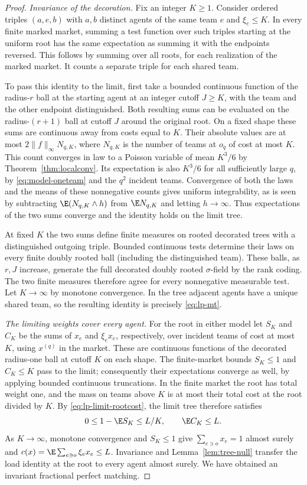 \begin{proof}
\emph{Invariance of the decoration.}
Fix an integer $K\ge1$. Consider ordered triples $(a,e,b)$ with $a,b$ distinct agents of
the same team $e$ and $\xi_e\le K$. In every finite marked market, summing a test function
over such triples starting at the uniform root has the same expectation as summing it
with the endpoints reversed. This follows by summing over all roots, for each realization
of the marked market. It counts a separate triple for each shared team.

To pass this identity to the limit, first take a bounded continuous function of the
radius-$r$ ball at the starting agent at an integer cutoff $J\ge K$, with the team and
the other endpoint distinguished. Both resulting sums can be evaluated on the
radius-$(r+1)$ ball at cutoff $J$ around the original root. On a fixed shape these sums
are continuous away from costs equal to $K$. Their absolute values are at most
$2\|f\|_\infty N_{q,K}$, where $N_{q,K}$ is the number of teams at $o_q$ of cost at most $K$.
This count converges in law to a Poisson variable of mean $K^3/6$ by
Theorem~\ref{thm:localconv}. Its expectation is also $K^3/6$ for all sufficiently large
$q$, by \eqref{eq:model-oneteam} and the $q^2$ incident teams. Convergence of both the
laws and the means of these nonnegative counts gives uniform integrability, as is seen
by subtracting $\E(N_{q,K}\wedge h)$ from $\E N_{q,K}$ and letting $h\to\infty$.
Thus expectations of the two sums converge and the identity holds on the limit tree.

At fixed $K$ the two sums define finite measures on rooted decorated trees with a
distinguished outgoing triple. Bounded continuous tests determine their laws on every
finite doubly rooted ball (including the distinguished team). These balls, as $r,J$
increase, generate the full decorated doubly rooted $\sigma$-field by the rank coding.
The two finite measures therefore agree for every nonnegative measurable test. Let
$K\to\infty$ by monotone convergence. In the tree adjacent agents have a unique shared
team, so the resulting identity is precisely \eqref{eq:lp-mt}.

\emph{The limiting weights cover every agent.}
For the root in either model let $S_K$ and $C_K$ be the sums of $x_e$ and $\xi_e x_e$,
respectively, over incident teams of cost at most $K$, using $x^{(q)}$ in the market.
These are continuous functions of the decorated radius-one ball at cutoff $K$ on each
shape. The finite-market bounds $S_K\le1$ and $C_K\le K$ pass to the limit; consequently
their expectations converge as well, by applying bounded continuous truncations.
In the finite market the root has total weight one, and the mass on teams above $K$ is
at most their total cost at the root divided by $K$. By \eqref{eq:lp-limit-rootcost},
the limit tree therefore satisfies
\[
0\le 1-\E S_K\le L/K,\qquad \E C_K\le L .
\]
As $K\to\infty$, monotone convergence and $S_K\le1$ give
$\sum_{e\ni o}x_e=1$ almost surely and $c(x)=\E\sum_{e\ni o}\xi_e x_e\le L$.
Invariance and Lemma~\ref{lem:tree-null} transfer the load identity at the root to every
agent almost surely. We have obtained an invariant fractional perfect matching.


\end{proof}
